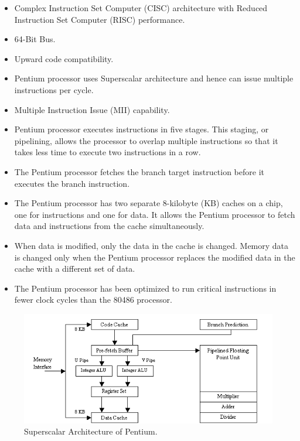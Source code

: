 \documentclass[doc,natbib,12pt]{apa6}
\begin{document}
	\begin{itemize}
		\item Complex Instruction Set Computer (CISC) architecture with Reduced Instruction Set Computer (RISC) performance.
		\item 64-Bit Bus.
		\item Upward code compatibility.
		\item Pentium processor uses Superscalar architecture and hence can issue multiple instructions per cycle.
		\item Multiple Instruction Issue (MII) capability.
		\item Pentium processor executes instructions in five stages. This staging, or pipelining, allows the processor to overlap multiple instructions so that it takes less time to execute two instructions in a row.
		\item The Pentium processor fetches the branch target instruction before it executes the branch instruction.
		\item The Pentium processor has two separate 8-kilobyte (KB) caches on a chip, one for instructions and one for data. It allows the Pentium processor to fetch data and instructions from the cache simultaneously.
		\item When data is modified, only the data in the cache is changed. Memory data is changed only when the Pentium processor replaces the modified data in the cache with a different set of data.
		\item The Pentium processor has been optimized to run critical instructions in fewer clock cycles than the 80486 processor.
	\end{itemize}
	
	\begin{figure}[htpb]
		\centering
		\includegraphics[width=1\textwidth]{1.png}
		\caption{\label{fig:superscalar}Superscalar Architecture of Pentium. \citep{Das}}
	\end{figure}
	
\end{document}
